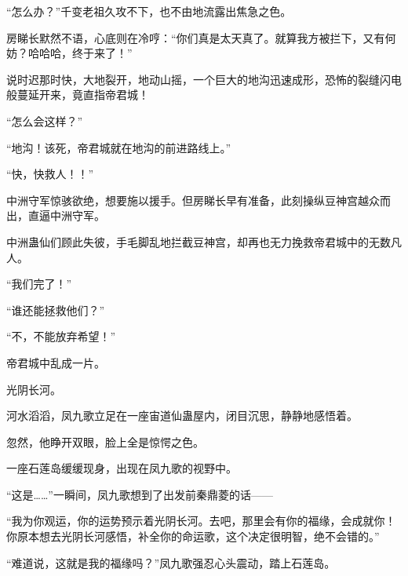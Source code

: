 \begin{this_body}
“怎么办？”千变老祖久攻不下，也不由地流露出焦急之色。

房睇长默然不语，心底则在冷哼：“你们真是太天真了。就算我方被拦下，又有何妨？哈哈哈，终于来了！”

说时迟那时快，大地裂开，地动山摇，一个巨大的地沟迅速成形，恐怖的裂缝闪电般蔓延开来，竟直指帝君城！

“怎么会这样？”

“地沟！该死，帝君城就在地沟的前进路线上。”

“快，快救人！！”

中洲守军惊骇欲绝，想要施以援手。但房睇长早有准备，此刻操纵豆神宫越众而出，直逼中洲守军。

中洲蛊仙们顾此失彼，手毛脚乱地拦截豆神宫，却再也无力挽救帝君城中的无数凡人。

“我们完了！”

“谁还能拯救他们？”

“不，不能放弃希望！”

帝君城中乱成一片。

光阴长河。

河水滔滔，凤九歌立足在一座宙道仙蛊屋内，闭目沉思，静静地感悟着。

忽然，他睁开双眼，脸上全是惊愕之色。

一座石莲岛缓缓现身，出现在凤九歌的视野中。

“这是……”一瞬间，凤九歌想到了出发前秦鼎菱的话——

“我为你观运，你的运势预示着光阴长河。去吧，那里会有你的福缘，会成就你！你原本想去光阴长河感悟，补全你的命运歌，这个决定很明智，绝不会错的。”

“难道说，这就是我的福缘吗？”凤九歌强忍心头震动，踏上石莲岛。

\end{this_body}

